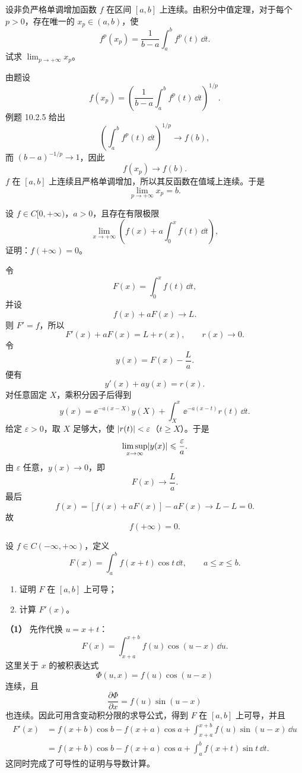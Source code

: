 \begin{xreferenceproblem}[13]
设非负严格单调增加函数 $f$ 在区间 $[a,b]$ 上连续。由积分中值定理，对于每个 $p>0$，存在唯一的 $x_p\in(a,b)$，使
\[
  f^p(x_p)=\frac1{b-a}\int_a^b f^p(t)\,\dd t.
\]
试求 $\lim_{p\to+\infty}x_p$。
\end{xreferenceproblem}
\begin{xsolution}
由题设
\[
  f(x_p)=
  \left(\frac1{b-a}\int_a^b f^p(t)\,\dd t\right)^{1/p}.
\]
例题 10.2.5 给出
\[
  \left(\int_a^b f^p(t)\,\dd t\right)^{1/p}\to f(b),
\]
而 $(b-a)^{-1/p}\to1$，因此
\[
  f(x_p)\to f(b).
\]
$f$ 在 $[a,b]$ 上连续且严格单调增加，所以其反函数在值域上连续。于是
\[
  \boxed{\lim_{p\to+\infty}x_p=b}.
\]
\end{xsolution}


\begin{xreferenceproblem}[14]
设 $f\in C[0,+\infty)$，$a>0$，且存在有限极限
\[
  \lim_{x\to+\infty}\left(f(x)+a\int_0^x f(t)\,\dd t\right),
\]
证明：$f(+\infty)=0$。
\end{xreferenceproblem}
\begin{xsolution}
令
\[
  F(x)=\int_0^x f(t)\,\dd t,
\]
并设
\[
  f(x)+aF(x)\to L.
\]
则 $F'=f$，所以
\[
  F'(x)+aF(x)=L+r(x),
  \qquad r(x)\to0.
\]
令
\[
  y(x)=F(x)-\frac La.
\]
便有
\[
  y'(x)+ay(x)=r(x).
\]
对任意固定 $X$，乘积分因子后得到
\[
  y(x)=\ee^{-a(x-X)}y(X)
  +\int_X^x\ee^{-a(x-t)}r(t)\,\dd t.
\]
给定 $\varepsilon>0$，取 $X$ 足够大，使 $\lvert r(t)\rvert<\varepsilon$（$t\geqslant X$）。于是
\[
  \limsup_{x\to\infty}\lvert y(x)\rvert\leqslant\frac\varepsilon a.
\]
由 $\varepsilon$ 任意，$y(x)\to0$，即
\[
  F(x)\to\frac La.
\]
最后
\[
  f(x)=[f(x)+aF(x)]-aF(x)\to L-L=0.
\]
故
\[
  \boxed{f(+\infty)=0}.
\]
\end{xsolution}


\begin{xreferenceproblem}[15]
设 $f\in C(-\infty,+\infty)$，定义
\[
  F(x)=\int_a^b f(x+t)\cos t\,\dd t,\qquad a\leqslant x\leqslant b.
\]
\begin{enumerate}[label=(\arabic*)]
  \item 证明 $F$ 在 $[a,b]$ 上可导；
  \item 计算 $F'(x)$。
\end{enumerate}
\end{xreferenceproblem}
\begin{xsolution}
\textbf{（1）}\quad
先作代换 $u=x+t$：
\[
  F(x)=\int_{x+a}^{x+b}f(u)\cos(u-x)\,\dd u.
\]
这里关于 $x$ 的被积表达式
\[
  \Phi(u,x)=f(u)\cos(u-x)
\]
连续，且
\[
  \frac{\partial\Phi}{\partial x}=f(u)\sin(u-x)
\]
也连续。因此可用含变动积分限的求导公式，得到 $F$ 在 $[a,b]$ 上可导，并且
\begin{align*}
  F'(x)
  &=f(x+b)\cos b-f(x+a)\cos a
  +\int_{x+a}^{x+b}f(u)\sin(u-x)\,\dd u\\
  &=\boxed{f(x+b)\cos b-f(x+a)\cos a
  +\int_a^b f(x+t)\sin t\,\dd t}.
\end{align*}
这同时完成了可导性的证明与导数计算。
\end{xsolution}


